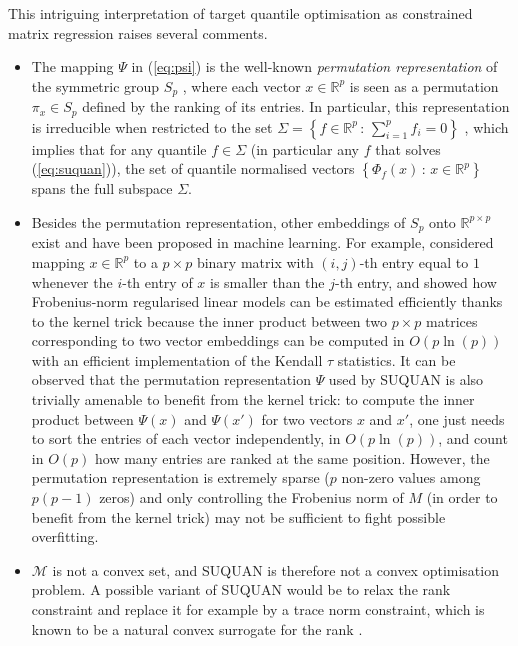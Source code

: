 \documentclass{article}
\newcommand{\RR}{\mathbb{R}} %
\newcommand{\Mcal}{\mathcal{M}}
\begin{document}
This intriguing interpretation of target quantile optimisation as constrained matrix regression raises several comments.
\begin{itemize}
\item The mapping $\Psi$ in (\ref{eq:psi}) is the well-known \emph{permutation representation} of the symmetric group $S_p$ \cite{Serres1977Linear, Diaconis1988Group}, where each vector $x\in\RR^p$ is seen as a permutation $\pi_x \in S_p$ defined by the ranking of its entries. In particular, this representation is irreducible when restricted to the set $\Sigma=\left\{f\in\RR^p\,:\,\sum_{i=1}^p f_i=0\right\}$ \cite[exercice 2.6]{Serres1977Linear}, which implies that for any quantile $f\in\Sigma$ (in particular any $f$ that solves (\ref{eq:suquan})), the set of quantile normalised vectors $\left\{\Phi_f(x)\,:\,x\in\RR^p\right\}$ spans the full subspace $\Sigma$.
\item Besides the permutation representation, other embeddings of $S_p$ onto $\RR^{p\times p}$ exist and have been proposed in machine learning. For example, \cite{Jiao2015Kendall} considered mapping $x\in\RR^p$ to a $p\times p$ binary matrix with $(i,j)$-th entry equal to $1$ whenever the $i$-th entry of $x$ is smaller than the $j$-th entry, and showed how Frobenius-norm regularised linear models can be estimated efficiently thanks to the kernel trick because the inner product between two $p\times p$ matrices corresponding to two vector embeddings can be computed in $O(p\ln(p))$ with an efficient implementation of the Kendall $\tau$ statistics. It can be observed that the permutation representation $\Psi$ used by SUQUAN is also trivially amenable to benefit from the kernel trick: to compute the inner product between $\Psi(x)$ and $\Psi(x')$ for two vectors $x$ and $x'$, one just needs to sort the entries of each vector independently, in $O(p \ln(p))$, and count in $O(p)$ how many entries are ranked at the same position. However, the permutation representation is extremely sparse ($p$ non-zero values among $p(p-1)$ zeros) and only controlling the Frobenius norm of $M$ (in order to benefit from the kernel trick) may not be sufficient to fight possible overfitting.
\item $\Mcal$ is not a convex set, and SUQUAN is therefore not a convex optimisation problem. A possible variant of SUQUAN would be to relax the rank constraint and replace it for example by a trace norm constraint, which is known to be a natural convex surrogate for the rank \cite{Srebro2005Rank}.
\end{itemize}
\end{document}
